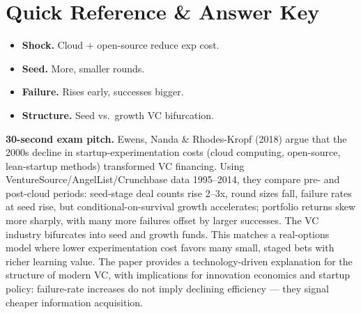 \documentclass[11pt]{article}
\begin{document}
\section*{Quick Reference \& Answer Key}
\begin{answerbox}
\begin{itemize}
\item \textbf{Shock.} Cloud + open-source reduce exp cost.
\item \textbf{Seed.} More, smaller rounds.
\item \textbf{Failure.} Rises early, successes bigger.
\item \textbf{Structure.} Seed vs.\ growth VC bifurcation.
\end{itemize}
\end{answerbox}

\begin{keybox}
\textbf{30-second exam pitch.} Ewens, Nanda \& Rhodes-Kropf (2018) argue that the 2000s decline in startup-experimentation costs (cloud computing, open-source, lean-startup methods) transformed VC financing. Using VentureSource/AngelList/Crunchbase data 1995--2014, they compare pre- and post-cloud periods: seed-stage deal counts rise 2--3x, round sizes fall, failure rates at seed rise, but conditional-on-survival growth accelerates; portfolio returns skew more sharply, with many more failures offset by larger successes. The VC industry bifurcates into seed and growth funds. This matches a real-options model where lower experimentation cost favors many small, staged bets with richer learning value. The paper provides a technology-driven explanation for the structure of modern VC, with implications for innovation economics and startup policy: failure-rate increases do not imply declining efficiency --- they signal cheaper information acquisition.
\end{keybox}
\end{document}
